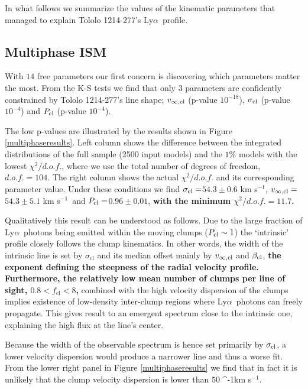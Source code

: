 \documentclass[a4paper,fleqn,usenatbib]{mnras}
\newcommand{\tol}{Tololo 1214-277}
\newcommand{\lya}{\ifmmode{{\rm Ly}\alpha}\else Ly$\alpha$\ \fi}
\newcommand{\kms}{\ifmmode\mathrm{km\ s}^{-1}\else km s$^{-1}$\fi}
\newcommand{\sigmaclump}{$54.3\pm 0.6$ km s$^{-1}$}
\newcommand{\inftyclump}{$54.3\pm 5.1$ km s$^{-1}$}
\newcommand{\probaclump}{$0.96\pm 0.01$}
\begin{document}
In what follows we summarize the values of the kinematic parameters
that managed to explain \tol's \lya profile.


\subsection{Multiphase ISM}

With $14$ free parameters our first concern is discovering which 
parameters matter the most.
From the K-S tests we find that only 3 parameters 
are confidently constrained by \tol's line shape;
$v_{\infty,\rm{cl}}$ (p-value  $10^{-18}$), $\sigma_{\rm cl}$ (p-value
$10^{-4}$) and $P_{\rm cl}$ (p-value $10^{-4}$). 

The low p-values are illustrated by the results shown in Figure \ref{multiphaseresults}.
Left column shows the difference between the integrated distributions
of the full sample (2500 input models) and the $1\%$ models with the lowest
$\chi^2/d.o.f.$, where we use the total number of degrees of freedom,
$d.o.f.=104$. 
The right column shows the actual $\chi^2/d.o.f.$ 
and its corresponding parameter value. 
Under these conditions we find $\sigma_{\rm cl}=$\sigmaclump,
$v_{\infty {\rm, cl}}=$\inftyclump\ and $P_{\rm cl}=$\probaclump, {\bf
  with the minimum $\chi^2/d.o.f.=11.7$.}

Qualitatively this result can be understood as follows.
Due to the large fraction of \lya photons being emitted within the
moving clumps ($P_{\rm cl}\sim 1$) the `intrinsic' profile closely follows 
the clump kinematics. 
In other words, the width of the intrinsic line
is set by $\sigma_{\mathrm{cl}}$ and its median offset mainly by
$v_{\infty,{\rm cl}}$ and $\beta_{\rm cl}$, {\bf the exponent defining
  the steepness of the radial velocity profile. } 
{\bf Furthermore, the relatively low mean number of clumps per line of
sight, $0.8<f_{\mathrm{cl}}<8$,} combined with the high velocity dispersion
of the clumps implies existence of low-density inter-clump 
regions where \lya photons can freely propagate.
This gives result to an emergent spectrum close to the intrinsic one, explaining the high
flux at the line's center.  

Because the width of the observable spectrum is hence set primarily by
$\sigma_{\rm cl}$, a lower velocity dispersion would produce a
narrower line and thus a worse fit. 
From the lower right panel in Figure \ref{multiphaseresults} we find
that in fact it is unlikely that the clump velocity dispersion is
lower than $50$ \kms. 
\end{document}
